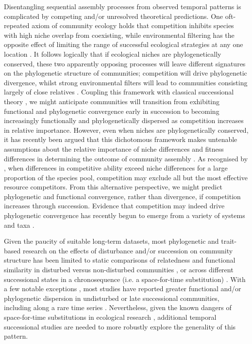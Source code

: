 Disentangling sequential assembly processes from observed temporal patterns is complicated by competing and/or unresolved theoretical predictions. One oft-repeated axiom of community ecology holds that competition inhibits species with high niche overlap from coexisting, while environmental filtering has the opposite effect of limiting the range of successful ecological strategies at any one location \citep{Weiher1995, Stubbs2004, Purschke2013}. It follows logically that if ecological niches are phylogenetically conserved, these two apparently opposing processes will leave different signatures on the phylogenetic structure of communities; competition will drive phylogenetic divergence, whilst strong environmental filters will lead to communities consisting largely of close relatives \citep{Webb2000, Webb2002}. Coupling this framework with classical successional theory \citep{Clements1916, Connell1977, Walker1987, Wilson1999}, we might anticipate communities will transition from exhibiting functional and phylogenetic convergence early in succession to becoming increasingly functionally and phylogenetically dispersed as competition increases in relative importance. However, even when niches are phylogenetically conserved, it has recently been argued that this dichotomous framework makes untenable assumptions about the relative importance of niche differences and fitness differences in determining the outcome of community assembly \citep{Chesson2000, Mayfield2010}. As recognised by \citet{Mayfield2010}, when differences in competitive ability exceed niche differences for a large proportion of the species pool, competition may exclude all but the most effective resource competitors. From this alternative perspective, we might predict phylogenetic and functional convergence, rather than divergence, if competition increases through succession. Evidence that competition may indeed drive phylogenetic convergence has recently begun to emerge from a variety of systems and taxa \citep{Kunstler2012, Bennett2013, Price2013, Narwani2013}.

Given the paucity of suitable long-term datasets, most phylogenetic and trait-based research on the effects of disturbance and/or succession on community structure has been limited to static comparisons of relatedness and functional similarity in disturbed versus non-disturbed communities \citep{VERDU2007, Knapp2008, Dinnage2009, Helmus2010}, or across different successional states in a chronosequence (i.e. a space-for-time substitution) \citep{Verdu2009, Letcher2010, Kunstler2012, Purschke2013}. With a few notable exceptions \citep{Verdu2009,Kunstler2012}, most studies have reported greater functional and/or phylogenetic dispersion in undisturbed or late successional communities, including along a rare time series \citep{Norden2012}. Nevertheless, given the known dangers of space-for-time substitutions in ecological research \citep{Johnson2008}, additional temporal successional studies are needed to more robustly explore the generality of this pattern.

